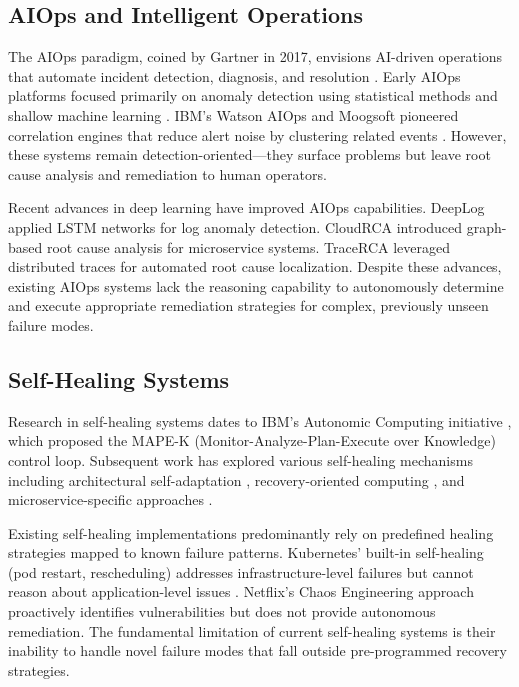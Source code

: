 \documentclass[journal]{IEEEtran}
\begin{document}
\subsection{AIOps and Intelligent Operations}

The AIOps paradigm, coined by Gartner in 2017, envisions AI-driven operations that automate incident detection, diagnosis, and resolution \cite{dang2019aiops}. Early AIOps platforms focused primarily on anomaly detection using statistical methods and shallow machine learning \cite{notaro2021survey}. IBM's Watson AIOps and Moogsoft pioneered correlation engines that reduce alert noise by clustering related events \cite{chen2024survey}. However, these systems remain detection-oriented---they surface problems but leave root cause analysis and remediation to human operators.

Recent advances in deep learning have improved AIOps capabilities. DeepLog \cite{du2017deeplog} applied LSTM networks for log anomaly detection. CloudRCA \cite{wang2021cloudrca} introduced graph-based root cause analysis for microservice systems. TraceRCA \cite{yu2023tracerca} leveraged distributed traces for automated root cause localization. Despite these advances, existing AIOps systems lack the reasoning capability to autonomously determine and execute appropriate remediation strategies for complex, previously unseen failure modes.

\subsection{Self-Healing Systems}

Research in self-healing systems dates to IBM's Autonomic Computing initiative \cite{kephart2003vision}, which proposed the MAPE-K (Monitor-Analyze-Plan-Execute over Knowledge) control loop. Subsequent work has explored various self-healing mechanisms including architectural self-adaptation \cite{krupitzer2015survey}, recovery-oriented computing \cite{patterson2002recovery}, and microservice-specific approaches \cite{soldani2022anomaly}.

Existing self-healing implementations predominantly rely on predefined healing strategies mapped to known failure patterns. Kubernetes' built-in self-healing (pod restart, rescheduling) addresses infrastructure-level failures but cannot reason about application-level issues \cite{burns2016borg}. Netflix's Chaos Engineering approach \cite{basiri2016chaos} proactively identifies vulnerabilities but does not provide autonomous remediation. The fundamental limitation of current self-healing systems is their inability to handle novel failure modes that fall outside pre-programmed recovery strategies.
\end{document}
